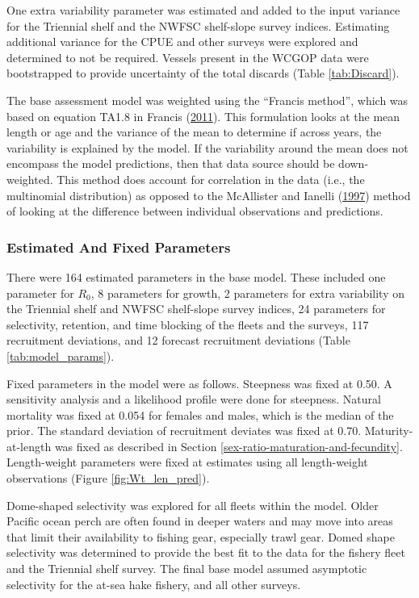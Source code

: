 \documentclass[12pt,]{article}
\begin{document}
One extra variability parameter was estimated and added to the input
variance for the Triennial shelf and the NWFSC shelf-slope survey
indices. Estimating additional variance for the CPUE and other surveys
were explored and determined to not be required. Vessels present in the
WCGOP data were bootstrapped to provide uncertainty of the total
discards (Table \ref{tab:Discard}).

The base assessment model was weighted using the ``Francis method'',
which was based on equation TA1.8 in Francis
(\protect\hyperlink{ref-francis_data_2011}{2011}). This formulation
looks at the mean length or age and the variance of the mean to
determine if across years, the variability is explained by the model. If
the variability around the mean does not encompass the model
predictions, then that data source should be down-weighted. This method
does account for correlation in the data (i.e., the multinomial
distribution) as opposed to the McAllister and Ianelli
(\protect\hyperlink{ref-mcallister_bayesian_1997}{1997}) method of
looking at the difference between individual observations and
predictions.

\subsubsection{Estimated And Fixed
Parameters}\label{estimated-and-fixed-parameters}

There were 164 estimated parameters in the base model. These included
one parameter for \(R_0\), 8 parameters for growth, 2 parameters for
extra variability on the Triennial shelf and NWFSC shelf-slope survey
indices, 24 parameters for selectivity, retention, and time blocking of
the fleets and the surveys, 117 recruitment deviations, and 12 forecast
recruitment deviations (Table \ref{tab:model_params}).

Fixed parameters in the model were as follows. Steepness was fixed at
0.50. A sensitivity analysis and a likelihood profile were done for
steepness. Natural mortality was fixed at 0.054 for females and males,
which is the median of the prior. The standard deviation of recruitment
deviates was fixed at 0.70. Maturity-at-length was fixed as described in
Section \ref{sex-ratio-maturation-and-fecundity}. Length-weight
parameters were fixed at estimates using all length-weight observations
(Figure \ref{fig:Wt_len_pred}).

Dome-shaped selectivity was explored for all fleets within the model.
Older Pacific ocean perch are often found in deeper waters and may move
into areas that limit their availability to fishing gear, especially
trawl gear. Domed shape selectivity was determined to provide the best
fit to the data for the fishery fleet and the Triennial shelf survey.
The final base model assumed asymptotic selectivity for the at-sea hake
fishery, and all other surveys.
\end{document}
